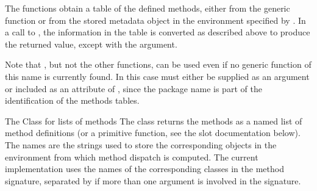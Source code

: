 %
\begin{Details}\relax

The functions obtain a table of the defined methods, either from the
generic function or from the stored metadata object in the environment
specified by .  In a call to , the information in the table is converted
as described above to produce the returned value, except with the
 argument.


Note that , but not the other functions, can be used
even if no generic function of this name is currently found.  In this
case  must either be supplied as an argument or included
as an attribute of , since the package name is part of the
identification of the methods tables.


\end{Details}
%
\begin{Section}{The Class for lists of methods}
The class  returns the methods as a named list
of method definitions (or a primitive function, see the slot
documentation below).  The names
are the strings used to store the corresponding objects in the
environment from which method dispatch is computed.
The current implementation uses the names of the corresponding classes
in the method signature, separated by  if more than one
argument is involved in the signature.
\end{Section}
%
